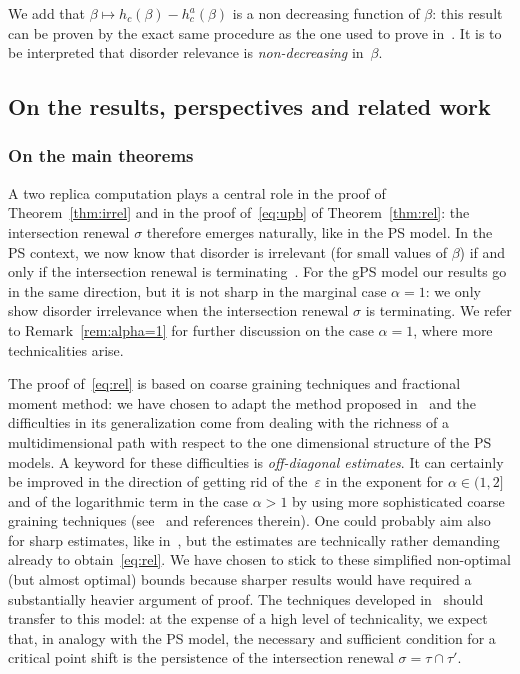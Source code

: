 \documentclass[10pt]{amsart}
\theoremstyle{definition}\newtheorem{defi}[theo]{Definition}\newtheorem{rema}[theo]{Remark}\newtheorem{exam}[theo]{Example}\newtheorem{exem}[theo]{Example}\newtheorem{nota}[theo]{Notation}
\newcommand{\ga}{\alpha}
\newcommand{\gb}{\beta}
\newcommand{\gep}{\varepsilon}
\begin{document}
We add that $\gb\mapsto h_c(\gb)-h_c^{a}(\gb)$ is a non decreasing function of $\beta$: this result can be proven by the exact same procedure as the one used to prove in~\cite[Proposition~6.1]{cf:GLT11}. It is to be interpreted that disorder relevance is \emph{non-decreasing} in~$\beta$.

\subsection{On the results, perspectives and related work}\label{sec:misc}

\subsubsection{On the main theorems}

A two replica computation plays a central role in the proof of Theorem~\ref{thm:irrel} and in the proof of~\eqref{eq:upb} of Theorem~\ref{thm:rel}: the intersection renewal $\sigma$ therefore emerges naturally, like in the PS model. In the PS context, we now know that disorder is irrelevant (for small values of $\gb$) if and only if the intersection renewal is terminating~\cite{cf:BL16}. For the gPS model our results go in the same direction, but it is not sharp in the marginal case $\ga=1$: we only show disorder irrelevance when the intersection renewal $\sigma$ is terminating. We refer to Remark~\ref{rem:alpha=1} for further discussion on the case $\ga=1$, where more technicalities arise.

The proof of~\eqref{eq:rel} is based on coarse graining techniques and fractional moment method: we have chosen to adapt the method proposed in~\cite{cf:DGLT09} and the difficulties in its generalization come from dealing with the richness of a multidimensional path with respect to the one dimensional structure of the PS models. A keyword for these difficulties is \emph{off-diagonal estimates}. It can certainly be improved in the direction of getting rid of the~$\gep$ in the exponent for $\ga \in (1, 2]$ and of the logarithmic term in the case $\ga >1$ by using more sophisticated coarse graining techniques (see~\cite[Chapter~6]{cf:G} and references therein). One could probably aim also for sharp estimates, like in~\cite{cf:BL16}, but the estimates are technically rather demanding already to obtain~\eqref{eq:rel}. We have chosen to stick to these simplified non-optimal (but almost optimal) bounds because sharper results would have required a substantially heavier argument of proof. The techniques developed in~\cite{cf:BL16bis,cf:BL16} should transfer to this model: at the expense of a high level of technicality, we expect that, in analogy with the PS model, the necessary and sufficient condition for a critical point shift is the persistence of the intersection renewal $\sigma=\tau\cap\tau'$.
\end{document}
